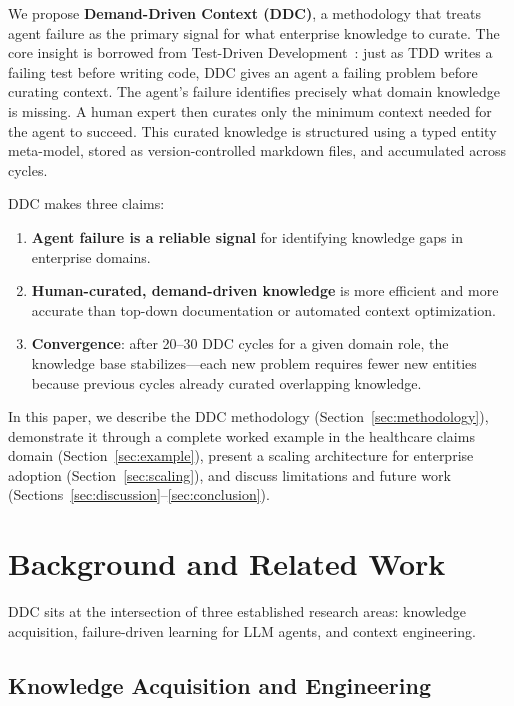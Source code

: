 \documentclass[11pt,a4paper]{article}
\begin{document}
We propose \textbf{Demand-Driven Context (DDC)}, a methodology that treats agent failure as the primary signal for what enterprise knowledge to curate. The core insight is borrowed from Test-Driven Development~\citep{beck2002tdd}: just as TDD writes a failing test before writing code, DDC gives an agent a failing problem before curating context. The agent's failure identifies precisely what domain knowledge is missing. A human expert then curates only the minimum context needed for the agent to succeed. This curated knowledge is structured using a typed entity meta-model, stored as version-controlled markdown files, and accumulated across cycles.

DDC makes three claims:

\begin{enumerate}
  \item \textbf{Agent failure is a reliable signal} for identifying knowledge gaps in enterprise domains.
  \item \textbf{Human-curated, demand-driven knowledge} is more efficient and more accurate than top-down documentation or automated context optimization.
  \item \textbf{Convergence}: after 20--30 DDC cycles for a given domain role, the knowledge base stabilizes---each new problem requires fewer new entities because previous cycles already curated overlapping knowledge.
\end{enumerate}

In this paper, we describe the DDC methodology (Section~\ref{sec:methodology}), demonstrate it through a complete worked example in the healthcare claims domain (Section~\ref{sec:example}), present a scaling architecture for enterprise adoption (Section~\ref{sec:scaling}), and discuss limitations and future work (Sections~\ref{sec:discussion}--\ref{sec:conclusion}).

\section{Background and Related Work}
\label{sec:related}

DDC sits at the intersection of three established research areas: knowledge acquisition, failure-driven learning for LLM agents, and context engineering.

\subsection{Knowledge Acquisition and Engineering}
\end{document}
